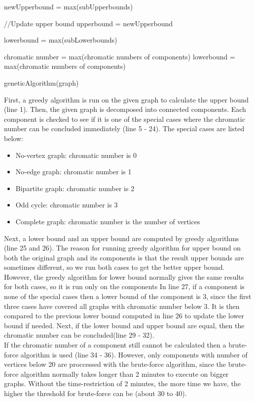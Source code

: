 \documentclass[a4paper]{report}
\begin{document}
		\begin{algorithm}                     
			\begin{algorithmic} [1]     

			\STATE newUpperbound = max(subUpperbounds)
			
			\STATE //Update upper bound
			\STATE upperbound = newUpperbound 
			\ENDIF
			
			\STATE lowerbound = max(subLowerbounds)
			
			\STATE chromatic number = max(chromatic numbers of components)
			\ELSE
			\STATE lowerbound = max(chromatic numbers of components)
			\ENDIF
			
			\STATE geneticAlgorithm(graph)
		\end{algorithmic}
	\end{algorithm}
	First, a greedy algorithm is run on the given graph to calculate the upper bound (line 1). Then, the given graph is decomposed into connected components. Each component is checked to see if it is one of the special cases where the chromatic number can be concluded immediately (line 5 - 24). The special cases are listed below: 
	\begin{itemize}
		\item No-vertex graph: chromatic number is 0
		\item No-edge graph: chromatic number is 1
		\item Bipartite graph: chromatic number is 2
		\item Odd cycle: chromatic number is 3
		\item Complete graph: chromatic number is the number of vertices
	\end{itemize}
	Next, a lower bound and an upper bound are computed by greedy algorithms (line 25 and 26). The reason for running greedy algorithm for upper bound on both the original graph and its components is that the result upper bounds are sometimes different, so we run both cases to get the better upper bound.  However, the greedy algorithm for lower bound normally gives the same results for both cases, so it is run only on the components
	In line 27, if a component is none of the special cases then a lower bound of the component is 3, since the first three cases have covered all graphs with chromatic number below 3. It is then compared to the previous lower bound computed in line 26 to update the lower bound if needed. Next, if the lower bound and upper bound are equal, then the chromatic number can be concluded(line 29 - 32). \\
	If the chromatic number of a component still cannot be calculated then a brute-force algorithm is used (line 34 - 36). However, only components with number of vertices below 20 are proccessed with the brute-force algorithm, since the brute-force algorithm normally takes longer than 2 minutes to execute on bigger graphs. Without the time-restriction of 2 minutes, the more time we have, the higher the threshold for brute-force can be (about 30 to 40).\\
	
\end{document}
